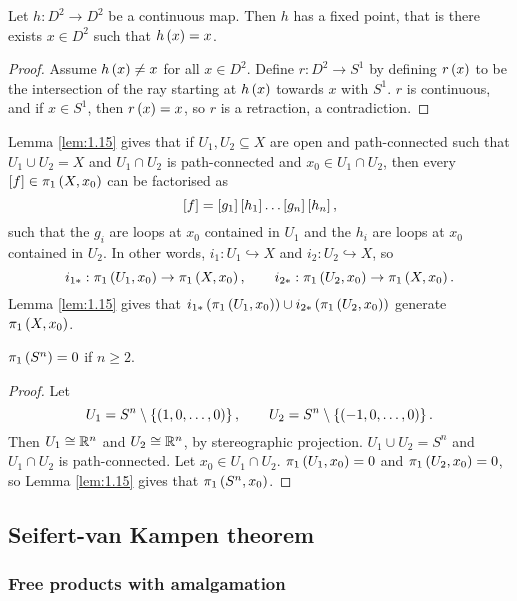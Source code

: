 \begin{theorem}
Let $ h : D^2 \to D^2 $ be a continuous map. Then $ h $ has a fixed point, that is there exists $ x \in D^2 $ such that $ h\rb{x} = x $.
\end{theorem}

\begin{proof}
Assume $ h\rb{x} \ne x $ for all $ x \in D^2 $. Define $ r : D^2 \to S^1 $ by defining $ r\rb{x} $ to be the intersection of the ray starting at $ h\rb{x} $ towards $ x $ with $ S^1 $. $ r $ is continuous, and if $ x \in S^1 $, then $ r\rb{x} = x $, so $ r $ is a retraction, a contradiction.
\end{proof}

Lemma \ref{lem:1.15} gives that if $ U_1, U_2 \subseteq X $ are open and path-connected such that $ U_1 \cup U_2 = X $ and $ U_1 \cap U_2 $ is path-connected and $ x_0 \in U_1 \cap U_2 $, then every $ \sb{f} \in \pi_1\rb{X, x_0} $ can be factorised as
$$ \sb{f} = \sb{g_1}\sb{h_1} \dots \sb{g_n}\sb{h_n}, $$
such that the $ g_i $ are loops at $ x_0 $ contained in $ U_1 $ and the $ h_i $ are loops at $ x_0 $ contained in $ U_2 $. In other words, $ i_1 : U_1 \hookrightarrow X $ and $ i_2 : U_2 \hookrightarrow X $, so
$$ i_{1*} : \pi_1\rb{U_1, x_0} \to \pi_1\rb{X, x_0}, \qquad i_{2*} : \pi_1\rb{U_2, x_0} \to \pi_1\rb{X, x_0}. $$
Lemma \ref{lem:1.15} gives that $ i_{1*}\rb{\pi_1\rb{U_1, x_0}} \cup i_{2*}\rb{\pi_1\rb{U_2, x_0}} $ generate $ \pi_1\rb{X, x_0} $.

\begin{proposition}
$ \pi_1\rb{S^n} = 0 $ if $ n \ge 2 $.
\end{proposition}

\begin{proof}
Let
$$ U_1 = S^n \setminus \cb{\rb{1, 0, \dots, 0}}, \qquad U_2 = S^n \setminus \cb{\rb{-1, 0, \dots, 0}}. $$
Then $ U_1 \cong \R^n $ and $ U_2 \cong \R^n $, by stereographic projection. $ U_1 \cup U_2 = S^n $ and $ U_1 \cap U_2 $ is path-connected. Let $ x_0 \in U_1 \cap U_2 $. $ \pi_1\rb{U_1, x_0} = 0 $ and $ \pi_1\rb{U_2, x_0} = 0 $, so Lemma \ref{lem:1.15} gives that $ \pi_1\rb{S^n, x_0} $.
\end{proof}

\pagebreak

\subsection{Seifert-van Kampen theorem}

\subsubsection{Free products with amalgamation}

